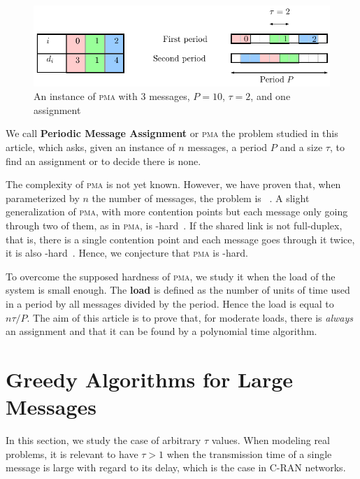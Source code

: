 \documentclass[a4paper,UKenglish,cleveref, autoref, thm-restate]{lipics-v2019}
\newcommand\pma{\textsc{pma}\xspace}
\begin{document}
\begin{figure}
\begin{center}
\includegraphics[scale=0.7]{instance}
\end{center}
\caption{An instance of \pma with $3$ messages, $P= 10$, $\tau = 2$, and one assignment}
\label{fig:assignment}
\end{figure}

We call \textbf{Periodic Message Assignment} or \pma the problem studied in this article,
which asks, given an instance of $n$ messages, a period $P$ and a size $\tau$, to find 
an assignment or to decide there is none.

The complexity of \pma is not yet known. However, we have proven that, when parameterized by
$n$ the number of messages, the problem is \FPT~\cite{barth2018deterministic}.
A slight generalization of \pma, with more contention points but each message only going through two of them, as in \pma, is \NP-hard~\cite{barth2018deterministic}. If the shared link is not full-duplex, that is, there is a single contention point and each message goes through it twice, it is also \NP-hard~\cite{orman1997complexity}. Hence, we conjecture that \pma is \NP-hard.

To overcome the supposed hardness of \pma, we study it when the load of the system is small enough. The \textbf{load} is defined as the number of units of time used in a period by all messages divided by the period. Hence the load is equal to $n\tau /P$. The aim of this article is to prove that, for moderate loads, there is \emph{always} an assignment and that it can be found by a polynomial time algorithm.



\section{Greedy Algorithms for Large Messages} \label{sec:large}

In this section, we study the case of arbitrary $\tau$ values. When modeling real problems,
it is relevant to have $\tau > 1$ when the transmission time of a single message is large with regard to its delay,
which is the case in C-RAN networks.
\end{document}
